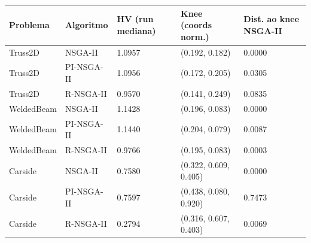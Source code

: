 \begin{tabular}{lllll}
\toprule
Problema & Algoritmo & HV (run mediana) & Knee (coords norm.) & Dist. ao knee NSGA-II \\
\midrule
Truss2D & NSGA-II & 1.0957 & (0.192, 0.182) & 0.0000 \\
Truss2D & PI-NSGA-II & 1.0956 & (0.172, 0.205) & 0.0305 \\
Truss2D & R-NSGA-II & 0.9570 & (0.141, 0.249) & 0.0835 \\
WeldedBeam & NSGA-II & 1.1428 & (0.196, 0.083) & 0.0000 \\
WeldedBeam & PI-NSGA-II & 1.1440 & (0.204, 0.079) & 0.0087 \\
WeldedBeam & R-NSGA-II & 0.9766 & (0.195, 0.083) & 0.0003 \\
Carside & NSGA-II & 0.7580 & (0.322, 0.609, 0.405) & 0.0000 \\
Carside & PI-NSGA-II & 0.7597 & (0.438, 0.080, 0.920) & 0.7473 \\
Carside & R-NSGA-II & 0.2794 & (0.316, 0.607, 0.403) & 0.0069 \\
\bottomrule
\end{tabular}
